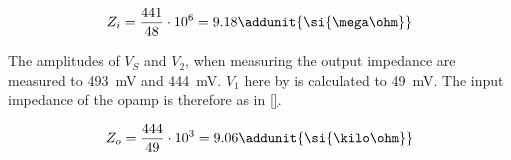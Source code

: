 \begin{equation}\label{eq:opamp_zi}
        Z_i = \frac{441}{48} \cdot 10^6 = 9.18
        \addunit{\si{\mega\ohm}}
    \end{equation} 
    
The amplitudes of $V_S$ and $V_2$, when measuring the output impedance are measured to \SI{493}{\milli\volt} and \SI{444}{\milli\volt}. $V_1$ here by is calculated to \SI{49}{\milli\volt}. The input impedance of the \gls{opamp} is therefore as in \autoref{}.

\begin{equation}\label{eq:opamp_zo}
        Z_o = \frac{444}{49} \cdot 10^3 = 9.06
        \addunit{\si{\kilo\ohm}}
    \end{equation} 
